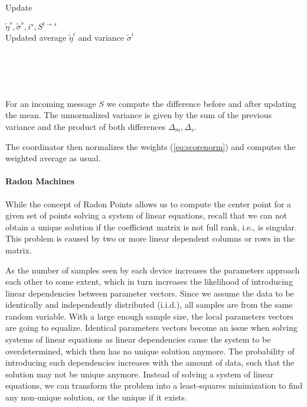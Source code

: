 \begin{algo}{Update}
    \begin{algorithm}[H]
        \begin{algorithmic}[1]
    \REQUIRE $\tilde{\eta}^s, \tilde{\sigma}^s, i^s, S^{t \rightarrow s}$ \\
    \ENSURE  Updated average $\tilde{\eta}^i$ and variance $\tilde{\sigma}^i$ \\
    \\
    \\
    \\
    \\
\end{algorithmic}
\caption[Update procedure for the online mean and variance computation]{For an incoming message $S$ we compute the difference before and after updating the mean. The unnormalized variance is given by the sum of the previous variance and the product of both differences $\Delta_m, \Delta_v$.}
\label{alg:updWelford}
\end{algorithm}
\end{algo}

The coordinator then normalizes the weights (\autoref{eq:scorenorm}) and computes the weighted average as usual.

\paragraph*{Radon Machines}
While the concept of Radon Points allows us to compute the center point for a given set of points solving a system of linear equations, recall that we can not obtain a unique solution if the coefficient matrix is not full rank, i.e., is singular.
This problem  is caused by two or more linear dependent columns or rows in the matrix.

As the number of samples seen by each device increases the parameters approach each other to some extent, which in turn increases the likelihood of introducing linear dependencies between parameter vectors.
Since we assume the data to be identically and independently distributed (i.i.d.), all samples are from the same random variable. 
With a large enough sample size, the local parameters vectors are going to equalize.
Identical parameters vectors become an issue when solving systems of linear equations as linear dependencies cause the system to be overdetermined, which then has no unique solution anymore.
The probability of introducing such dependencies increases with the amount of data, such that the solution may not be unique anymore.
Instead of solving a system of linear equations, we can transform the problem into a least-squares minimization to find any non-unique solution, or the unique if it exists.

